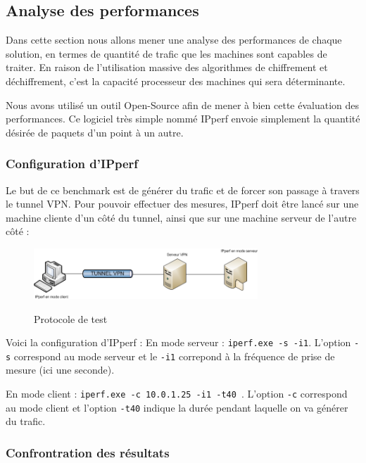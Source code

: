 \subsection{Analyse des performances}

Dans cette section nous allons mener une analyse des performances de chaque solution, en termes de quantité de trafic que les machines sont capables de traiter. En raison de l'utilisation massive des algorithmes de chiffrement et déchiffrement, c'est la capacité processeur des machines qui sera déterminante.

Nous avons utilisé un outil Open-Source afin de mener à bien cette évaluation des performances. Ce logiciel très simple nommé IPperf envoie simplement la quantité désirée de paquets d'un point à un autre.

\subsubsection{Configuration d'IPperf}

Le but de ce benchmark est de générer du trafic et de forcer son passage à travers le tunnel VPN. Pour pouvoir effectuer des mesures, IPperf doit être lancé sur une machine cliente d'un côté du tunnel, ainsi que sur une machine serveur de l'autre côté :

\begin{figure}[H]
	\begin{center}
		\includegraphics[width=0.75\textwidth]{partie_3/images/ipperf.png}\\
	\end{center}
	\caption{Protocole de test}
	\label{Protocole_de_test}
\end{figure}

Voici la configuration d'IPperf :
En mode serveur : \verb|iperf.exe -s -i1|. L'option \verb|-s| correspond au mode serveur et le \verb|-i1| correpond à la fréquence de prise de mesure (ici une seconde).

En mode client : \verb|iperf.exe -c 10.0.1.25 -i1 -t40 |. L'option \verb|-c| correspond au mode client et l'option \verb|-t40| indique la durée pendant laquelle on va générer du trafic.

\subsubsection{Confrontration des résultats}

